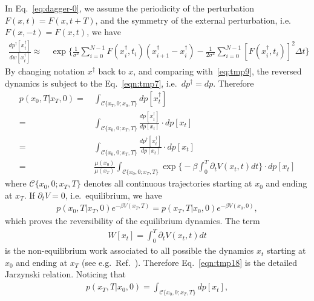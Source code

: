 \documentclass[aps, pre, preprint,unsortedaddress,a4paper,onecolumn]{revtex4}
\newcommand{\mc}[0]{\mathcal {C}}
\newcommand{\dt}[0]{\Delta t}
\begin{document}
In Eq.~\eqref{eq:dagger-0}, we assume the periodicity of the perturbation $F(x,t) = F(x,t+T)$, and the symmetry of the external perturbation, i.e.~$F(x, -t) = F(x, t)$, we have
\begin{align}
  \frac{dp^\dagger[x^\dagger_t]}{dw[x^\dagger_t]}  
  \approx\,&
  \exp\bigg\{
  \frac1{\sigma^2}\sum_{i=0}^{N-1} F(x^\dagger_{i},t_{i})(x^\dagger_{i+1} - x^\dagger_i) -
  \frac1{2\sigma^2}\sum_{i=0}^{N-1}[F(x^\dagger_i, t_i)]^2\dt\bigg\}  
\end{align}
By changing notation $x^\dagger$ back to $x$, and comparing with~\eqref{eq:tmp9}, the reversed dynamics is subject to the Eq.~\eqref{eqn:tmp7},
i.e.~$dp^\dagger = dp$.
Therefore
\begin{align}\nonumber
  p(x_0,T\vert x_T,0)
  =&\,\int_{\mc\{x_T,0;x_0,T\}}
  dp[x^\dagger_t] \\\nonumber  
  =&\,
  \int_{\mc\{x_0,0;x_T,T\}}
  \frac{  dp[x^\dagger_t] }{ dp[x_t]} \cdot dp[x_t] \\\nonumber
  =&\,
  \int_{\mc\{x_0,0;x_T,T\}}
  \frac{  dp^\dagger[x^\dagger_t] }{ dp[x_t]} \cdot dp[x_t] \\\label{eqn:tmp18}
  = &\,
  \frac{\mu(x_0)}{\mu(x_T)}
  \int_{\mc\{x_0,0;x_T,T\}}
  \exp\bigg\{
  -\beta\int_0^T \partial_t V(x_t,t)dt 
  \bigg\} \cdot dp[x_t]
\end{align}
where $\mc\{x_0,0;x_T,T\}$ denotes all continuous trajectories starting at $x_0$ and ending at $x_T$.
If $\partial_t V = 0$, i.e.~equilibrium, we have
\begin{align}
  p(x_0,T\vert x_T,0)e^{-\beta V(x_T,T)} =  p(x_T,T\vert x_0,0) e^{-\beta V(x_0,0)},
\end{align}
which proves the reversibility of the equilibrium dynamics.
The term
\begin{align}
  W[x_t] = \int_0^T \partial_t V(x_t,t)dt
\end{align}
is the non-equilibrium work associated to all possible
the dynamics $x_t$ starting at $x_0$ and ending at $x_T$ (see e.g.~Ref.~\cite{seifert2012stochastic}).
Therefore Eq.~\eqref{eqn:tmp18} is the detailed Jarzynski relation.
Noticing that
\begin{align}
  \label{eq:tmp21}
  p(x_T,T\vert x_0,0) = \int_{\mc\{x_0,0;x_T,T\}}dp[x_t],
\end{align}
\end{document}
